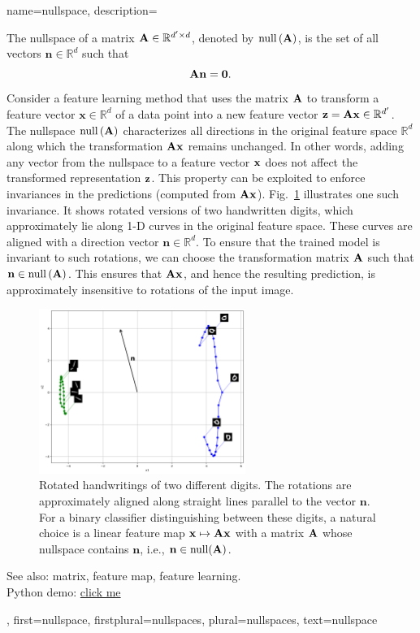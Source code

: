 {
{name={nullspace},
	description={The nullspace of a matrix ${\bf A} \in \mathbb{R}^{d' \times d}$, 
		denoted by ${\rm null}\left({\bf A} \right)$, is the set of all vectors $\mathbf{n} \in \mathbb{R}^d$ 
    		such that $${\bf A} \mathbf{n} = \mathbf{0}.$$ 
		Consider a feature learning method that uses the matrix ${\bf A}$ to transform 
		a feature vector $\mathbf{x} \in \mathbb{R}^{d}$ of a data point 
		into a new feature vector ${\bf z} = {\bf A} \mathbf{x} \in \mathbb{R}^{d'}$. 
		The nullspace ${\rm null}\left({\bf A} \right)$ characterizes all directions in the original 
    		feature space $\mathbb{R}^{d}$ along which the transformation 
		${\bf A} \mathbf{x}$ remains unchanged. In other words, adding any vector from 
		the nullspace to a feature vector ${\bf x}$ does not affect the transformed 
		representation ${\bf z}$. This property can be exploited to enforce invariances in the 
		predictions (computed from ${\bf A} \mathbf{x}$). Fig.\ \ref{fig:nullspace-rotation-dict} 
		illustrates one such invariance. It shows rotated versions of two handwritten digits, 
		which approximately lie along 1-D curves in the original feature space. 
		These curves are aligned with a direction vector $\mathbf{n} \in \mathbb{R}^{d}$. 
    		To ensure that the trained model is invariant to such rotations, we can 
		choose the transformation matrix ${\bf A}$ such that $\mathbf{n} \in {\rm null}\left({\bf A} \right)$. 
		This ensures that ${\bf A} \mathbf{x}$, and hence the resulting prediction, 
		is approximately insensitive to rotations of the input image.
		\begin{figure}[H]
      			\centering
      			\includegraphics[width=0.6\textwidth]{assets/pythonsnacks/nullspace_0_1.png}
	  		\caption{
			Rotated handwritings of two different digits. The rotations are approximately 
			aligned along straight lines parallel to the vector $\mathbf{n}$. For a 
			binary classifier distinguishing between these digits, a natural choice is 
			a linear feature map ${\bf x} \mapsto \mathbf{A}{\bf x}$ with a 
			matrix ${\bf A}$ whose nullspace contains $\mathbf{n}$, i.e., $\mathbf{n} \in \mathrm{null}({\bf A})$.
                \label{fig:nullspace-rotation-dict}}	
	       	\end{figure}
		See also: matrix, feature map, feature learning. \\ 
		Python demo: \href{https://github.com/AaltoDictionaryofML/AaltoDictionaryofML.github.io/blob/main/assets/pythonsnacks/nullspace.py}{click me}},
 	first={nullspace},
 	firstplural={nullspaces},
 	plural={nullspaces},
 	text={nullspace}
}


}
